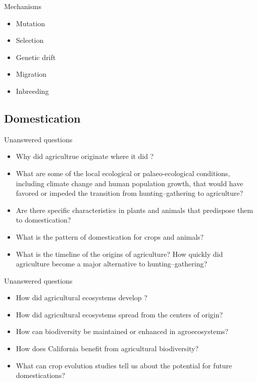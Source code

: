 \documentclass[ignorenonframetext,aspectratio=169]{beamer}
\providecommand{\tightlist}{%
  \setlength{\itemsep}{0pt}\setlength{\parskip}{0pt}}
\begin{document}
\begin{frame}{Mechanisms}
\protect\hypertarget{mechanisms}{}

\begin{itemize}
\tightlist
\item
  Mutation
\item
  Selection
\item
  Genetic drift
\item
  Migration
\item
  Inbreeding
\end{itemize}

\end{frame}

\hypertarget{domestication}{%
\subsection{Domestication}\label{domestication}}

\begin{frame}{Unanswered questions}
\protect\hypertarget{unanswered-questions}{}

\begin{itemize}[<+->]
\tightlist
\item
  Why did agricultrue originate where it did ?
\item
  What are some of the local ecological or palaeo-ecological conditions,
  including climate change and human population growth, that would have
  favored or impeded the transition from hunting--gathering to
  agriculture?
\item
  Are there specific characteristics in plants and animals that
  predispose them to domestication?
\item
  What is the pattern of domestication for crops and animals?
\item
  What is the timeline of the origins of agriculture? How quickly did
  agriculture become a major alternative to hunting--gathering?
\end{itemize}

\end{frame}

\begin{frame}{Unanswered questions}
\protect\hypertarget{unanswered-questions-1}{}

\begin{itemize}[<+->]
\tightlist
\item
  How did agricultural ecosystems develop ?
\item
  How did agricultural ecosystems spread from the centers of origin?
\item
  How can biodiversity be maintained or enhanced in agroecosystems?
\item
  How does California benefit from agricultural biodiversity?
\item
  What can crop evolution studies tell us about the potential for future
  domestications?
\end{itemize}

\end{frame}
\end{document}
